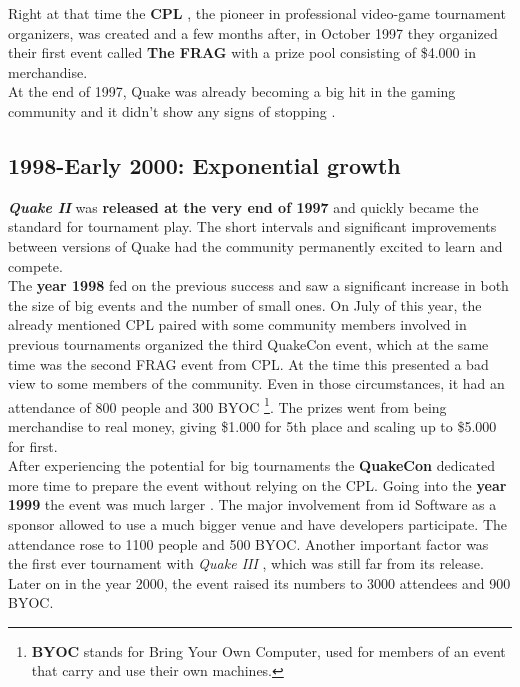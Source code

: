 Right at that time the \textbf{CPL} \citep{web:cpl}, the pioneer in professional video-game tournament organizers, was created and a few months after, in October 1997 they organized their first event called \textbf{The FRAG} with a prize pool consisting of \$4.000 in merchandise.\\

At the end of 1997, Quake was already becoming a big hit in the gaming community and it didn't show any signs of stopping \citep{wagner2006scientific}.\\

\subsection{1998-Early 2000: Exponential growth}


\textbf{\textit{Quake II}} \citep{game:quake2} was \textbf{released at the very end of 1997} and quickly became the standard for tournament play. The short intervals and significant improvements between versions of Quake had the community permanently excited to learn and compete.\\

The \textbf{year 1998} fed on the previous success and saw a significant increase in both the size of big events and the number of small ones. On July of this year, the already mentioned CPL paired with some community members involved in previous tournaments organized the third QuakeCon event, which at the same time was the second FRAG event from CPL. At the time this presented a bad view to some members of the community. Even in those circumstances, it had an attendance of 800 people and 300 BYOC \footnote{\textbf{BYOC} stands for Bring Your Own Computer, used for members of an event that carry and use their own machines.}. The prizes went from being merchandise to real money, giving \$1.000 for 5th place and scaling up to \$5.000 for first.\\

After experiencing the potential for big tournaments the \textbf{QuakeCon} dedicated more time to prepare the event without relying on the CPL. Going into the \textbf{year 1999} the event was much larger \parencite{lewis1999peace}. The major involvement from id Software as a sponsor allowed to use a much bigger venue and have developers participate. The attendance rose to 1100 people and 500 BYOC. Another important factor was the first ever tournament with \textit{Quake III} \citep{game:quake3}, which was still far from its release.\\ Later on in the year 2000, the event raised its numbers to 3000 attendees and 900 BYOC.\\

